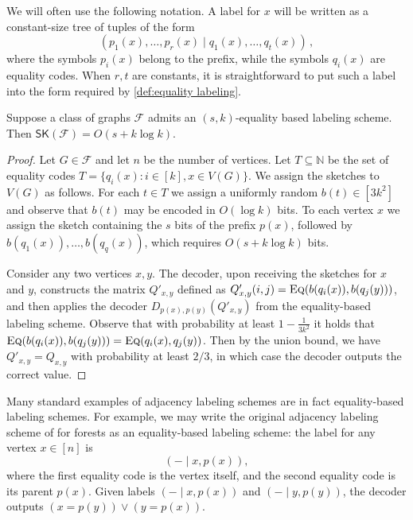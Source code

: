 \documentclass{theoretics}
\newcommand\eqLabelSep{\mathbin|}
\newcommand{\cF}{\ensuremath{\mathcal{F}}}
\newcommand{\bN}{\ensuremath{\mathbb{N}}}
\newcommand{\Eq}{\textsc{Eq}}
\newcommand{\RL}{\mathsf{SK}}
\begin{document}
\begin{remark}\label{rm:conv-form}
We will often use the following notation. A label for $x$ will be written as a constant-size tree of
tuples of the form
\[
  (p_1(x), \dotsc, p_r(x) \eqLabelSep q_1(x), \dotsc, q_t(x) ) \,,
\]
where the symbols $p_i(x)$ belong to the prefix, while the symbols $q_i(x)$ are equality codes. When
$r,t$ are constants, 
it is straightforward to
put such a label into the form required by \cref{def:equality labeling}.
\end{remark}

\begin{proposition}
\label{prop:eq-label-to-sk}
Suppose a class of graphs $\cF$ admits an $(s,k)$-equality based labeling scheme. Then
$\RL(\cF) = O(s + k \log k)$.
\end{proposition}
\begin{proof}
Let $G \in \cF$ and let $n$ be the number of vertices. Let $T \subseteq \bN$ be the set of equality
codes $T = \{ q_i(x) : i \in [k], x \in V(G) \}$. We assign the sketches to $V(G)$ as
follows. For each $t \in T$ we assign a uniformly random $b(t) \in [3k^2]$ and observe that $b(t)$
may be encoded in $O(\log k)$ bits. To each vertex $x$ we assign the sketch
containing the $s$ bits of the prefix $p(x)$, followed by $b(q_1(x)), \dotsc, b(q_q(x))$, which
requires $O(s + k \log k)$ bits.

Consider any two vertices $x,y$. The decoder, upon receiving the sketches for $x$ and $y$,
constructs the matrix $Q'_{x,y}$ defined as $Q'_{x,y}(i,j) = \Eq(b(q_i(x)), b(q_j(y)))$, and then
applies the decoder $D_{p(x),p(y)}(Q'_{x,y})$ from the equality-based labeling scheme.  Observe that with probability at least $1 - \frac{1}{3k^2}$ it holds that
$\Eq(b(q_i(x)), b(q_j(y)))  = \Eq(q_i(x), q_j(y))$.
Then by the union bound, we have $Q'_{x,y} = Q_{x,y}$ with probability at least $2/3$, in which
case the decoder outputs the correct value.
\end{proof}

\begin{example}
\label{example:forests}
Many standard examples of adjacency labeling schemes are in fact equality-based labeling schemes.
For example, we may write the original adjacency labeling scheme of \cite{KNR92} for forests as an
equality-based labeling scheme: the label for any vertex $x \in [n]$ is
\[
  ( - \mid x, p(x) ),
\]
where the first equality code is the vertex itself, and the second equality code is its parent $p(x)$. Given labels $( - \mid x, p(x))$ and $( - \mid y, p(y))$,
the decoder outputs $(x = p(y)) \vee (y = p(x))$.
\end{example}
\end{document}

